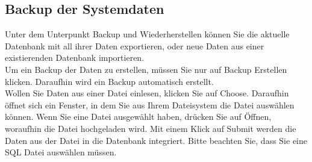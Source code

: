 \documentclass[enabledeprecatedfontcommands,fontsize=12pt,paper=a4,twoside]{scrartcl}
\begin{document}
\subsection{Backup der Systemdaten}
Unter dem Unterpunkt Backup und Wiederherstellen können Sie die aktuelle Datenbank mit all ihrer Daten exportieren, oder neue Daten aus einer existierenden Datenbank importieren. \\

Um ein Backup der Daten zu erstellen, müssen Sie nur auf Backup Erstellen klicken. Daraufhin wird ein Backup automatisch erstellt.  \\

Wollen Sie Daten aus einer Datei einlesen, klicken Sie auf Choose. Daraufhin öffnet sich ein Fenster, in dem Sie aus Ihrem Dateisystem die Datei auswählen können. Wenn Sie eine Datei ausgewählt haben, drücken Sie auf Öffnen, woraufhin die Datei hochgeladen wird. Mit einem Klick auf Submit werden die Daten aus der Datei in die Datenbank integriert. Bitte beachten Sie, dass  Sie eine SQL Datei auswählen müssen. \\ 
\end{document}
